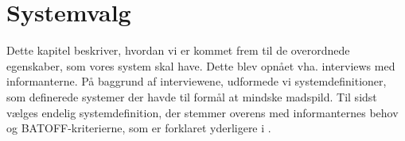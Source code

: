 \chapter{Systemvalg}
\label{chap:systemvalg}
Dette kapitel beskriver, hvordan vi er kommet frem til de overordnede egenskaber, som vores system skal have. Dette blev opnået vha. interviews med informanterne. På baggrund af interviewene, udformede vi systemdefinitioner, som definerede systemer der havde til formål at mindske madspild. Til sidst vælges endelig systemdefinition, der stemmer overens med informanternes behov og BATOFF-kriterierne, som er forklaret yderligere i .





